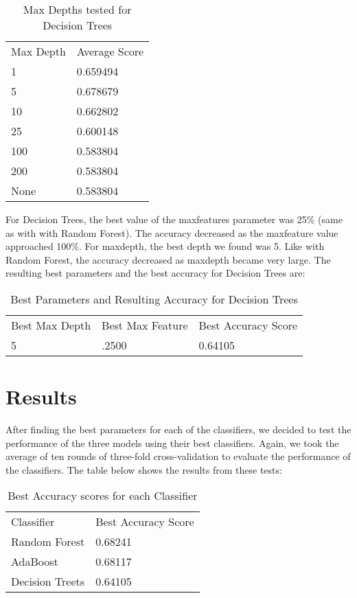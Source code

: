 \documentclass[11pt]{article}
\begin{document}
\begin{table}[H]
\centering
\caption{Max Depths tested for Decision Trees}
\label{my-label}
\begin{tabular}{ll}
Max Depth & Average Score \\
1         & 0.659494            \\
5         & 0.678679            \\
10        & 0.662802            \\
25        & 0.600148            \\
100       & 0.583804            \\
200       & 0.583804            \\
None      & 0.583804           
\end{tabular}
\end{table}

For Decision Trees, the best value of the max\textunderscore features parameter was 25\% (same as with with Random Forest). The accuracy decreased as the max\textunderscore feature value approached 100\%. For max\textunderscore depth, the best depth we found was 5. Like with Random Forest, the accuracy decreased as max\textunderscore depth became very large.
The resulting best parameters and the best accuracy for Decision Trees are:

\begin{table}[H]
\centering
\caption{Best Parameters and Resulting Accuracy for Decision Trees}
\label{my-label}
\begin{tabular}{lll}
Best Max Depth & Best Max Feature & Best Accuracy Score \\
5              & .2500            & 0.64105
\end{tabular}
\end{table}


\section{Results}

After finding the best parameters for each of the classifiers, we decided to test the performance of the three models using their best classifiers. Again, we took the average of ten rounds of three-fold cross-validation to evaluate the performance of the classifiers. The table below shows the results from these tests:

\begin{table}[H]
\centering
\caption{Best Accuracy scores for each Classifier}
\label{my-label}
\begin{tabular}{ll}
Classifier      & Best Accuracy Score \\
Random Forest   & 0.68241 \\
AdaBoost        & 0.68117 \\
Decision Treets & 0.64105
\end{tabular}
\end{table}
\end{document}
